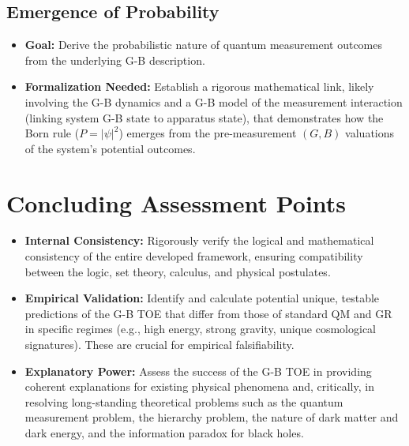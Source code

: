\documentclass{article}
\begin{document}
\subsection{Emergence of Probability}
\begin{itemize}
    \item \textbf{Goal:} Derive the probabilistic nature of quantum measurement outcomes from the underlying G-B description.
    \item \textbf{Formalization Needed:} Establish a rigorous mathematical link, likely involving the G-B dynamics and a G-B model of the measurement interaction (linking system G-B state to apparatus state), that demonstrates how the Born rule ($P = |\psi|^2$) emerges from the pre-measurement $(G, B)$ valuations of the system's potential outcomes.
\end{itemize}

\section{Concluding Assessment Points}

\begin{itemize}
    \item \textbf{Internal Consistency:} Rigorously verify the logical and mathematical consistency of the entire developed framework, ensuring compatibility between the logic, set theory, calculus, and physical postulates.
    \item \textbf{Empirical Validation:} Identify and calculate potential unique, testable predictions of the G-B TOE that differ from those of standard QM and GR in specific regimes (e.g., high energy, strong gravity, unique cosmological signatures). These are crucial for empirical falsifiability.
    \item \textbf{Explanatory Power:} Assess the success of the G-B TOE in providing coherent explanations for existing physical phenomena and, critically, in resolving long-standing theoretical problems such as the quantum measurement problem, the hierarchy problem, the nature of dark matter and dark energy, and the information paradox for black holes.
\end{itemize}
\end{document}

